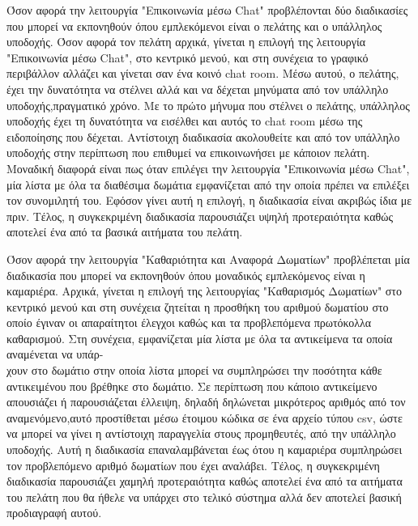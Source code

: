 \noindent
Όσον αφορά την λειτουργία "Επικοινωνία μέσω Chat" προβλέπονται δύο διαδικασίες που μπορεί να 
εκπονηθούν όπου εμπλεκόμενοι είναι ο πελάτης και ο υπάλληλος υποδοχής. Όσον αφορά τον πελάτη
αρχικά, γίνεται η επιλογή της λειτουργία "Επικοινωνία μέσω Chat", στο κεντρικό μενού, και στη 
συνέχεια το γραφικό περιβάλλον αλλάζει και γίνεται σαν ένα κοινό chat room.  Μέσω αυτού, ο 
πελάτης, έχει την δυνατότητα να στέλνει αλλά και να δέχεται μηνύματα από τον υπάλληλο 
υποδοχής,πραγματικό χρόνο. Με το πρώτο μήνυμα που στέλνει ο πελάτης, υπάλληλος υποδοχής 
έχει τη δυνατότητα να εισέλθει και αυτός το chat room μέσω της ειδοποίησης που δέχεται.  
Αντίστοιχη διαδικασία ακολουθείτε και από τον υπάλληλο υποδοχής στην περίπτωση που 
επιθυμεί να επικοινωνήσει με κάποιον πελάτη. Μοναδική διαφορά είναι πως όταν επιλέγει την 
λειτουργία "Επικοινωνία μέσω Chat", μία λίστα με όλα τα διαθέσιμα δωμάτια εμφανίζεται από την
οποία πρέπει να επιλέξει τον συνομιλητή του. Εφόσον γίνει αυτή η επιλογή, η διαδικασία είναι 
ακριβώς ίδια με πριν. Τέλος, η συγκεκριμένη διαδικασία παρουσιάζει υψηλή προτεραιότητα
καθώς αποτελεί ένα από τα βασικά αιτήματα του πελάτη.
\clearpage

\noindent
Όσον αφορά την λειτουργία "Καθαριότητα και Αναφορά Δωματίων" προβλέπεται μία διαδικασία
που μπορεί να εκπονηθούν όπου μοναδικός εμπλεκόμενος είναι η καμαριέρα. Αρχικά, γίνεται η 
επιλογή της λειτουργίας "Καθαρισμός Δωματίων" στο κεντρικό  μενού και στη συνέχεια ζητείται 
η προσθήκη του αριθμού δωματίου στο οποίο έγιναν οι απαραίτητοι έλεγχοι καθώς και τα 
προβλεπόμενα πρωτόκολλα καθαρισμού. Στη συνέχεια, εμφανίζεται μία λίστα με όλα τα αντικείμενα
τα οποία αναμένεται να υπάρ-\\χουν στο δωμάτιο στην οποία λίστα μπορεί να συμπληρώσει 
την ποσότητα κάθε αντικειμένου που βρέθηκε στο δωμάτιο. Σε περίπτωση που κάποιο 
αντικείμενο απουσιάζει ή παρουσιάζεται έλλειψη, δηλαδή δηλώνεται μικρότερος αριθμός από 
τον αναμενόμενο,αυτό προστίθεται μέσω έτοιμου κώδικα σε ένα αρχείο τύπου csv, ώστε να 
μπορεί να γίνει η αντίστοιχη παραγγελία στους προμηθευτές, από την υπάλληλο υποδοχής.
Αυτή η διαδικασία επαναλαμβάνεται έως ότου η καμαριέρα συμπληρώσει τον προβλεπόμενο 
αριθμό δωματίων που έχει αναλάβει. Τέλος, η συγκεκριμένη διαδικασία παρουσιάζει χαμηλή 
προτεραιότητα καθώς αποτελεί ένα από τα αιτήματα του πελάτη που θα ήθελε να υπάρχει στο 
τελικό σύστημα αλλά δεν αποτελεί βασική προδιαγραφή αυτού. \\


